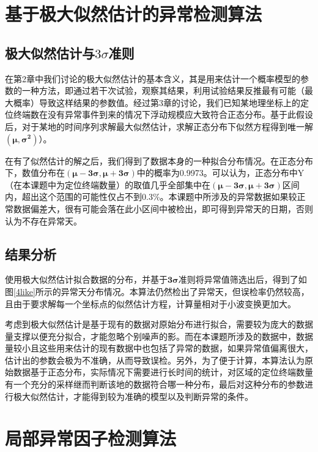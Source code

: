 \documentclass[a4paper,AutoFakeBold,oneside,12pt]{book}
\begin{document}

\section{基于极大似然估计的异常检测算法}
\subsection{极大似然估计与$3\sigma$准则}
	在第2章中我们讨论的极大似然估计的基本含义，其是用来估计一个概率模型的参数的一种方法，即通过若干次试验，观察其结果，利用试验结果反推最有可能（最大概率）导致这样结果的参数值。经过第3章的讨论，我们已知某地理坐标上的定位终端数在没有异常事件到来的情况下浮动规模应大致符合正态分布。基于此假设后，对于某地的时间序列求解最大似然估计，求解正态分布下似然方程得到唯一解$\bm{(\mu,\sigma^2)}$）。

	在有了似然估计的解之后，我们得到了数据本身的一种拟合分布情况。在正态分布下，数值分布在$\bm{(\mu-3\sigma,\mu+3\sigma)}$中的概率为0.9973。可以认为，正态分布中Y（在本课题中为定位终端数量）的取值几乎全部集中在$\bm{(\mu-3\sigma,\mu+3\sigma)}$区间内，超出这个范围的可能性仅占不到0.3\%。本课题中所涉及的异常数据如果较正常数据偏差大，很有可能会落在此小区间中被检出，即可得到异常天的日期，否则认为不存在异常天。

\subsection{结果分析}
	使用极大似然估计拟合数据的分布，并基于$\bm{3\sigma}$准则将异常值筛选出后，得到了如图\ref{4like}所示的异常天分布情况。本算法仍然检出了异常天，但误检率仍然较高，且由于要求解每一个坐标点的似然估计方程，计算量相对于小波变换更加大。


	考虑到极大似然估计是基于现有的数据对原始分布进行拟合，需要较为庞大的数据量支撑以便充分拟合，才能忽略个别噪声的影。而在本课题所涉及的数据中，数据量较小且这些用来估计的现有数据中也包括了异常的数据，如果异常值偏离很大，估计出的参数会极为不准确，从而导致误检。另外，为了便于计算，本算法认为原始数据基于正态分布，实际情况下需要进行长时间的统计，对区域的定位终端数量有一个充分的采样继而判断该地的数据符合哪一种分布，最后对这种分布的参数进行极大似然估计，才能得到较为准确的模型以及判断异常的条件。

\section{局部异常因子检测算法}
\end{document}
